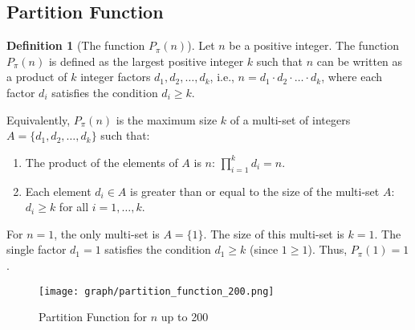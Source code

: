 \documentclass[]{article}
\theoremstyle{plain}%
\theoremstyle{definition}
\newtheorem{defn}{Definition}[section]
\theoremstyle{remark}
\begin{document}
	\subsection{Partition Function}
	\begin{defn}[The function $P_{\pi}(n)$]
		\label{defn:part_func}
		Let $n$ be a positive integer. The function $P_{\pi}(n)$ is defined as the largest positive integer $k$ such that $n$ can be written as a product of $k$ integer factors $d_1, d_2, \ldots, d_k$, i.e., $n = d_1 \cdot d_2 \cdot \ldots \cdot d_k$, where each factor $d_i$ satisfies the condition $d_i \ge k$.
		
		Equivalently, $P_{\pi}(n)$ is the maximum size $k$ of a multi-set of integers $A = \{d_1, d_2, \ldots, d_k\}$ such that:
		\begin{enumerate}
			\item The product of the elements of $A$ is $n$: $\prod_{i=1}^k d_i = n$.
			\item Each element $d_i \in A$ is greater than or equal to the size of the multi-set $A$: $d_i \ge k$ for all $i=1, \ldots, k$.
		\end{enumerate}
		For $n=1$, the only multi-set is $A=\{1\}$. The size of this multi-set is $k=1$. The single factor $d_1=1$ satisfies the condition $d_1 \ge k$ (since $1 \ge 1$). Thus, $P_{\pi}(1)=1$.
	\end{defn}
	\begin{figure}[h]
		\caption{Partition Function for $n$ up to 200}
		\centering
		\texttt{[image: graph/partition\_function\_200.png]}
	\end{figure}
\end{document}
